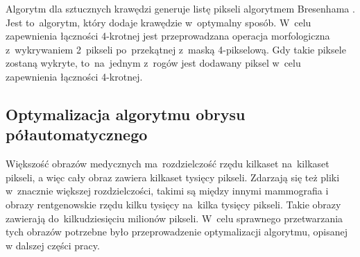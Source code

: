 \documentclass[a4paper,11pt,twoside,openright]{report}
\theoremstyle{definition}
\begin{document}
Algorytm dla sztucznych krawędzi generuje listę pikseli algorytmem Bresenhama
\cite{Bresenham}. Jest to~algorytm, który dodaje krawędzie w~optymalny sposób.
W~celu zapewnienia łączności 4-krotnej jest przeprowadzana operacja
morfologiczna z~wykrywaniem 2~pikseli po~przekątnej z~maską 4-pikselową. Gdy takie
piksele zostaną wykryte, to~na~jednym z~rogów jest dodawany piksel w~celu
zapewnienia łączności 4-krotnej.

\subsection {Optymalizacja algorytmu obrysu półautomatycznego}

Większość obrazów medycznych ma~rozdzielczość rzędu kilkaset na~kilkaset pikseli,
a więc cały obraz zawiera kilkaset tysięcy pikseli. Zdarzają się też
pliki w~znacznie większej rozdzielczości, takimi są między innymi mammografia i
obrazy rentgenowskie rzędu kilku tysięcy na~kilka tysięcy pikseli.
Takie obrazy zawierają do~kilkudziesięciu milionów
pikseli. W~celu sprawnego przetwarzania tych obrazów potrzebne było przeprowadzenie optymalizacji
algorytmu, opisanej w dalszej części pracy.
\end{document}

